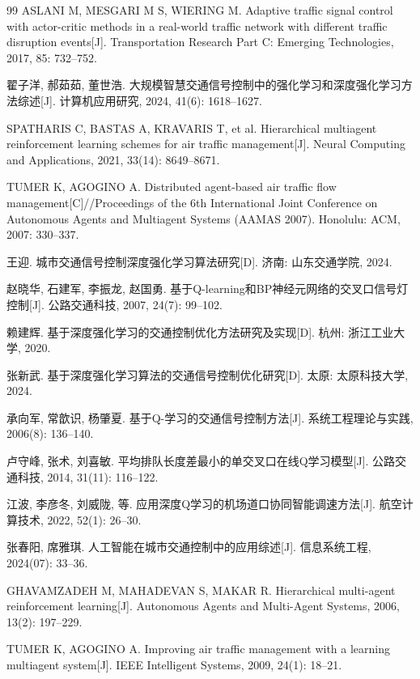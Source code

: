 \documentclass[12pt,a4paper,UTF8]{ctexart}
\begin{document}
\begin{thebibliography}{99}
 ASLANI M, MESGARI M S, WIERING M. Adaptive traffic signal control with actor-critic methods in a real-world traffic network with different traffic disruption events[J]. Transportation Research Part C: Emerging Technologies, 2017, 85: 732--752.

 翟子洋, 郝茹茹, 董世浩. 大规模智慧交通信号控制中的强化学习和深度强化学习方法综述[J]. 计算机应用研究, 2024, 41(6): 1618--1627.

 SPATHARIS C, BASTAS A, KRAVARIS T, et al. Hierarchical multiagent reinforcement learning schemes for air traffic management[J]. Neural Computing and Applications, 2021, 33(14): 8649--8671.

 TUMER K, AGOGINO A. Distributed agent-based air traffic flow management[C]//Proceedings of the 6th International Joint Conference on Autonomous Agents and Multiagent Systems (AAMAS 2007). Honolulu: ACM, 2007: 330--337.

 王迎. 城市交通信号控制深度强化学习算法研究[D]. 济南: 山东交通学院, 2024.

 赵晓华, 石建军, 李振龙, 赵国勇. 基于Q-learning和BP神经元网络的交叉口信号灯控制[J]. 公路交通科技, 2007, 24(7): 99--102.

 赖建辉. 基于深度强化学习的交通控制优化方法研究及实现[D]. 杭州: 浙江工业大学, 2020.

 张新武. 基于深度强化学习算法的交通信号控制优化研究[D]. 太原: 太原科技大学, 2024.

 承向军, 常歆识, 杨肇夏. 基于Q-学习的交通信号控制方法[J]. 系统工程理论与实践, 2006(8): 136--140.

 卢守峰, 张术, 刘喜敏. 平均排队长度差最小的单交叉口在线Q学习模型[J]. 公路交通科技, 2014, 31(11): 116--122.

 江波, 李彦冬, 刘威陇, 等. 应用深度Q学习的机场道口协同智能调速方法[J]. 航空计算技术, 2022, 52(1): 26--30.

 张春阳, 席雅琪. 人工智能在城市交通控制中的应用综述[J]. 信息系统工程, 2024(07): 33--36.

 GHAVAMZADEH M, MAHADEVAN S, MAKAR R. Hierarchical multi-agent reinforcement learning[J]. Autonomous Agents and Multi-Agent Systems, 2006, 13(2): 197--229.

 TUMER K, AGOGINO A. Improving air traffic management with a learning multiagent system[J]. IEEE Intelligent Systems, 2009, 24(1): 18--21.


\end{thebibliography}
\end{document}
